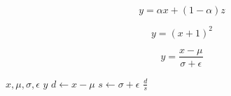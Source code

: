 \begin{equation}
\label{eq:weighted}
y = \alpha x + (1 - \alpha) z
\end{equation}

\begin{equation}
\label{eq:expanded}
y = (x + 1)^2
\end{equation}

\begin{equation}
\label{eq:normalize}
y = \frac{x - \mu}{\sigma + \epsilon}
\end{equation}

\begin{algorithm}
\caption{Normalize with an explicit denominator}
\label{alg:normalize}
\begin{algorithmic}
\Require $x, \mu, \sigma, \epsilon$
\Ensure $y$
\State $d \gets x - \mu$
\State $s \gets \sigma + \epsilon$
\State \Return $\frac{d}{s}$
\end{algorithmic}
\end{algorithm}
